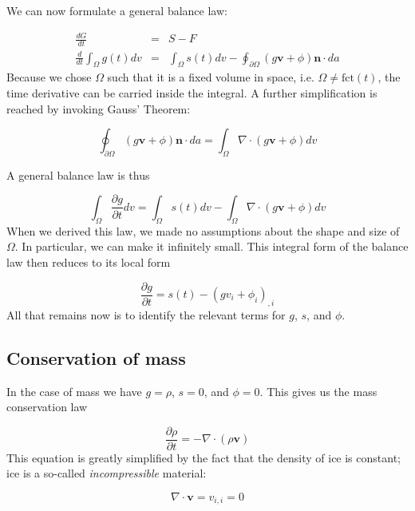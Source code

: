 \documentclass[12pt, openany]{memoir}
\newcommand{\pder}[2]{\ensuremath{\frac{\partial #1}{\partial #2}}}
\begin{document}
We can now formulate a general balance law:

\begin{eqnarray}
\frac{dG}{dt} &=& S - F \\
\frac{d}{dt} \int_\Omega g(t) dv &=& \int_\Omega s(t) dv -
\oint_{\partial \Omega} (g \mathbf{v} + \phi) \mathbf{n} \cdot da
\end{eqnarray}
Because we chose $\Omega$ such that it is a fixed volume in space,
i.e. $\Omega \ne \mathrm{fct}(t)$, the time derivative can be carried
inside the integral. A further simplification is reached by invoking
Gauss' Theorem: 

\begin{equation}
\oint_{\partial \Omega} (g \mathbf{v} + \phi) \mathbf{n} \cdot da =
\int_\Omega \nabla \cdot (g \mathbf{v} + \phi) dv
\end{equation}

A general balance law is thus

\begin{equation}
\int_\Omega \pder{g}{t} dv = \int_\Omega s(t) dv - \int_\Omega \nabla
\cdot (g \mathbf{v} + \phi) dv
\end{equation}
When we derived this law, we made no assumptions about the shape and
size of $\Omega$. In particular, we can make it infinitely small. This
integral form of the balance law then reduces to its local form

\begin{equation}
\pder{g}{t} = s(t) - (g v_i + \phi_i)_{,i} 
\end{equation}
All that remains now is to identify the relevant terms for $g$, $s$,
and $\phi$.

\subsection{Conservation of mass}

In the case of mass we have $g = \rho$, $s = 0$, and $\phi = 0$. This
gives us the mass conservation law 

\begin{equation}
\pder{\rho}{t} = - \nabla \cdot (\rho \mathbf{v})
\end{equation}
This equation is greatly simplified by the fact that the density of
ice is constant; ice is a so-called \emph{incompressible} material:

\begin{equation} \label{eq:mass}
\nabla \cdot \mathbf{v} = v_{i,i} = 0
\end{equation}
\end{document}

